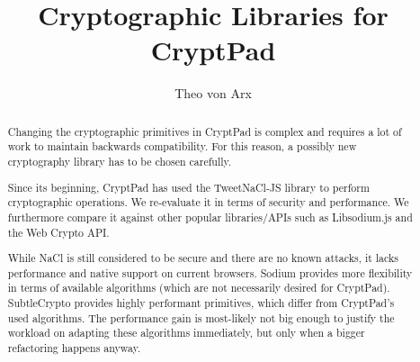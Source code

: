 \documentclass[a4paper, 11pt]{article}
\begin{document}


\newcommand{\myAlgofont}[1]{\ifmmode\mathsf{{#1}}\else\textsf{{#1}}\fi\xspace}
\newcommand{\myHash}[1]{\ensuremath{\myAlgofont{H}({#1})}}
\newcommand{\myKGen}[2][]{\ensuremath{\myAlgofont{KGen}\ifthenelse{\equal{#1}{}}{}{#1}({#2})}}
\newcommand{\mypwd}{\myAlgofont{pwd}}
\newcommand{\mychanID}{\myAlgofont{chanID}}
\newcommand{\myViewKeyStr}{\myAlgofont{viewKeyStr}}
\newcommand{\myEditKeyStr}{\myAlgofont{editKeyStr}}
\newcommand{\myPK}{\myAlgofont{PK}}
\newcommand{\mySK}{\myAlgofont{SK}}
\newcommand{\mySymKey}{\myAlgofont{K}}

\author{Theo von Arx}

\title{Cryptographic Libraries for CryptPad}

\maketitle

\begin{abstract}
Changing the cryptographic primitives in CryptPad is complex and requires
a lot of work to maintain backwards compatibility. For this reason, a
possibly new cryptography library has to be chosen carefully.

Since its beginning, CryptPad has used the TweetNaCl-JS library to perform
cryptographic operations. We re-evaluate it in terms of security and
performance. We furthermore compare it against other
popular libraries/APIs such as Libsodium.js and the Web Crypto API.

While NaCl is still considered to be secure and there are no known
attacks, it lacks performance and native support on current browsers.
Sodium provides more flexibility in terms of available algorithms (which
are not necessarily desired for CryptPad). SubtleCrypto provides highly
performant primitives, which differ from CryptPad's used algorithms. The
performance gain is most-likely not big enough to justify the workload
on adapting these algorithms immediately, but only when a bigger refactoring happens anyway.
\end{abstract}
\end{document}

